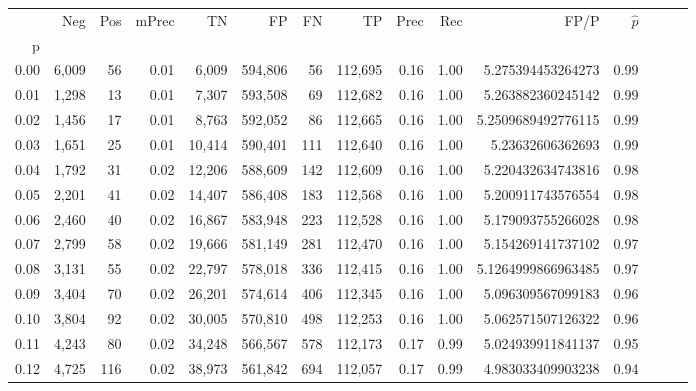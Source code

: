 \begin{tabular}{rrrrrrrrrrrrrrr}
\toprule
{} &     Neg &    Pos & mPrec &       TN &       FP &       FN &       TP &  Prec &   Rec &                  FP/P & $\hat{p}$ \\
p    &         &        &       &          &          &          &          &       &       &                       &           \\
\midrule
0.00 &   6,009 &     56 &  0.01 &    6,009 &  594,806 &       56 &  112,695 &  0.16 &  1.00 &     5.275394453264273 &      0.99 \\
0.01 &   1,298 &     13 &  0.01 &    7,307 &  593,508 &       69 &  112,682 &  0.16 &  1.00 &     5.263882360245142 &      0.99 \\
0.02 &   1,456 &     17 &  0.01 &    8,763 &  592,052 &       86 &  112,665 &  0.16 &  1.00 &    5.2509689492776115 &      0.99 \\
0.03 &   1,651 &     25 &  0.01 &   10,414 &  590,401 &      111 &  112,640 &  0.16 &  1.00 &      5.23632606362693 &      0.99 \\
0.04 &   1,792 &     31 &  0.02 &   12,206 &  588,609 &      142 &  112,609 &  0.16 &  1.00 &     5.220432634743816 &      0.98 \\
0.05 &   2,201 &     41 &  0.02 &   14,407 &  586,408 &      183 &  112,568 &  0.16 &  1.00 &     5.200911743576554 &      0.98 \\
0.06 &   2,460 &     40 &  0.02 &   16,867 &  583,948 &      223 &  112,528 &  0.16 &  1.00 &     5.179093755266028 &      0.98 \\
0.07 &   2,799 &     58 &  0.02 &   19,666 &  581,149 &      281 &  112,470 &  0.16 &  1.00 &     5.154269141737102 &      0.97 \\
0.08 &   3,131 &     55 &  0.02 &   22,797 &  578,018 &      336 &  112,415 &  0.16 &  1.00 &    5.1264999866963485 &      0.97 \\
0.09 &   3,404 &     70 &  0.02 &   26,201 &  574,614 &      406 &  112,345 &  0.16 &  1.00 &     5.096309567099183 &      0.96 \\
0.10 &   3,804 &     92 &  0.02 &   30,005 &  570,810 &      498 &  112,253 &  0.16 &  1.00 &     5.062571507126322 &      0.96 \\
0.11 &   4,243 &     80 &  0.02 &   34,248 &  566,567 &      578 &  112,173 &  0.17 &  0.99 &     5.024939911841137 &      0.95 \\
0.12 &   4,725 &    116 &  0.02 &   38,973 &  561,842 &      694 &  112,057 &  0.17 &  0.99 &     4.983033409903238 &      0.94 \\

\end{tabular}
